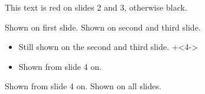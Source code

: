 \documentclass{beamer}
\begin{document}
\begin{frame}
 This text is red on slides 2 and 3, otherwise black.
\end{frame}

\begin{frame}
Shown on first slide.
Shown on second and third slide.
\begin{itemize}
\item
Still shown on the second and third slide.
\onslide+<4->
\item
Shown from slide 4 on.
\end{itemize}
Shown from slide 4 on.
\onslide
Shown on all slides.
\end{frame}
\end{document}
